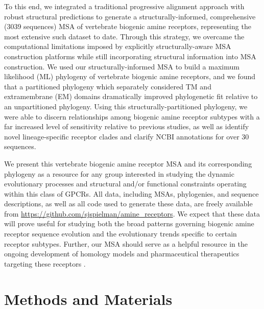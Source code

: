 \documentclass[fleqn,10pt]{wlpeerj}
\begin{document}
To this end, we integrated a traditional progressive alignment approach with robust structural predictions to generate a structurally-informed, comprehensive (3039 sequences) MSA of vertebrate biogenic amine receptors, representing the most extensive such dataset to date. Through this strategy,  we overcame the computational limitations imposed by explicitly structurally-aware MSA construction platforms while still incorporating structural information into MSA construction. We used our structurally-informed MSA to build a maximum likelihood (ML) phylogeny of vertebrate biogenic amine receptors, and we found that a partitioned phylogeny which separately considered TM and extramembrane (EM) domains dramatically improved phylogenetic fit relative to an unpartitioned phylogeny. Using this structurally-partitioned phylogeny, we were able to discern relationships among biogenic amine receptor subtypes with a far increased level of sensitivity relative to previous studies, as well as identify novel lineage-specific receptor clades and clarify NCBI annotations for over 30 sequences.

We present this vertebrate biogenic amine receptor MSA and its corresponding phylogeny as a resource for any group interested in studying the dynamic evolutionary processes and structural and/or functional constraints operating within this class of GPCRs. All data, including MSAs, phylogenies, and sequence descriptions, as well as all code used to generate these data, are freely available from \url{https://github.com/sjspielman/amine\_receptors}. We expect that these data will prove useful for studying both the broad patterns governing biogenic amine receptor sequence evolution and the evolutionary trends specific to certain receptor subtypes. Further, our MSA should serve as a helpful resource in the ongoing development of homology models and pharmaceutical therapeutics targeting these receptors \citep{Kristiansen2004,Ishiguro2004,Eversetal2005,Masonetal2012}.




\section*{Methods and Materials}
\end{document}

